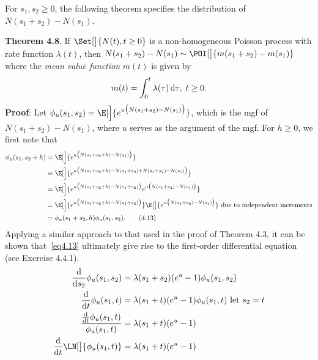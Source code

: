For $ s_1,s_2\ge 0 $, the following theorem specifies the distribution of $ N(s_1+s_2)-N(s_1) $.
\begin{Result}
    \textbf{Theorem 4.8}. If $ \Set[\big]{N(t),t\ge 0} $ is a non-homogeneous Poisson process with rate function
    $ \lambda(t) $, then $ N(s_1+s_2)-N(s_1)\sim \POI[\big]{m(s_1+s_2)-m(s_1)} $ where the \emph{mean value function}
    $ m(t) $ is given by
    \[ m(t)=\int_{0}^{t}\lambda(\tau)\odif{\tau},\; t\ge 0. \]
    \tcblower{}
    \textbf{Proof}: Let $ \phi_u(s_1,s_2)=\E[\Big]{e^{u\bigl(N(s_1+s_2)-N(s_1)\bigr)}} $, which is the mgf of $ N(s_1+s_2)-N(s_1) $,
    where $ u $ serves as the argument of the mgf. For $ h\ge 0 $, we first note that
    \begin{align*}
        \phi_u(s_1,s_2+h)
         & =\E[\Big]{e^{u\bigl(N(s_1+s_2+h)-N(s_1)\bigr)}}                                                                                      \\
         & =\E[\Big]{e^{u\bigl(N(s_1+s_2+h)-N(s_1+s_2)+N(s_1+s_2)-N(s_1)\bigr)}}                                                                \\
         & =\E[\Big]{e^{u\bigl(N(s_1+s_2+h)-N(s_1+s_2)\bigr)}e^{u\bigl(N(s_1+s_2)-N(s_1)\bigr)}}                                                \\
         & =\E[\Big]{e^{u\bigl(N(s_1+s_2+h)-N(s_1+s_2)\bigr)}}\E[\big]{e^{u\bigl(N(s_1+s_2)-N(s_1)\bigr)}}\text{ due to independent increments} \\
         & =\phi_u(s_1+s_2,h)\phi_u(s_1,s_2).\label{eq4.13}\tag*{(4.13)}
    \end{align*}
    Applying a similar approach to that used in the proof of Theorem 4.3, it can be shown that~\ref{eq4.13} ultimately give rise
    to the first-order differential equation (see Exercise 4.4.1).
    \begin{align*}
        \odv*{\phi_u(s_1,s_2)}{s_2}
                                                             & =\lambda(s_1+s_2)(e^u-1)\phi_u(s_1,s_2)                \\
        \odv*{\phi_u(s_1,t)}{t}
                                                             & =\lambda(s_1+t)(e^u-1)\phi_u(s_1,t)\text{ let $s_2=t$} \\
        \frac{\odv*{\phi_u(s_1,t)}{t}}{\phi_u(s_1,t)}        & =\lambda(s_1+t)(e^u-1)                                 \\
        \odv*{\LN[\big]{\phi_u(s_1,t)}}{t}                   & =\lambda(s_1+t)(e^u-1)                                 \\

\end{align*}
\end{Result}
